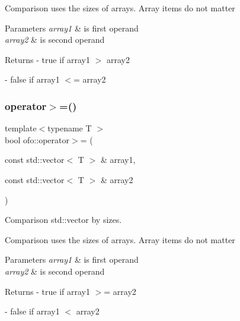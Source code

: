 Comparison uses the sizes of arrays. Array items do not matter 
\begin{DoxyParams}{Parameters}
{\em array1} & is first operand \\
\hline
{\em array2} & is second operand \\
\hline
\end{DoxyParams}
\begin{DoxyReturn}{Returns}
-\/ true if \textquotesingle{}array1\textquotesingle{} $>$ \textquotesingle{}array2\textquotesingle{} 

-\/ false if \textquotesingle{}array1\textquotesingle{} $<$= \textquotesingle{}array2\textquotesingle{} 
\end{DoxyReturn}
\mbox{\label{namespaceofo_aeff44072bd4fb8ed491c94e7eb4c2059}} 
\subsubsection{\texorpdfstring{operator$>$=()}{operator>=()}}
{\footnotesize\ttfamily template$<$typename T $>$ \\
bool ofo\+::operator$>$= (\begin{DoxyParamCaption}\item[{const std\+::vector$<$ T $>$ \&}]{array1,  }\item[{const std\+::vector$<$ T $>$ \&}]{array2 }\end{DoxyParamCaption})}



Comparison std\+::vector by sizes. 

Comparison uses the sizes of arrays. Array items do not matter 
\begin{DoxyParams}{Parameters}
{\em array1} & is first operand \\
\hline
{\em array2} & is second operand \\
\hline
\end{DoxyParams}
\begin{DoxyReturn}{Returns}
-\/ true if \textquotesingle{}array1\textquotesingle{} $>$= \textquotesingle{}array2\textquotesingle{} 

-\/ false if \textquotesingle{}array1\textquotesingle{} $<$ \textquotesingle{}array2\textquotesingle{} 
\end{DoxyReturn}
\mbox{\label{namespaceofo_afe5c86df101d1623b1aea71e3ba7b0a9}} 
